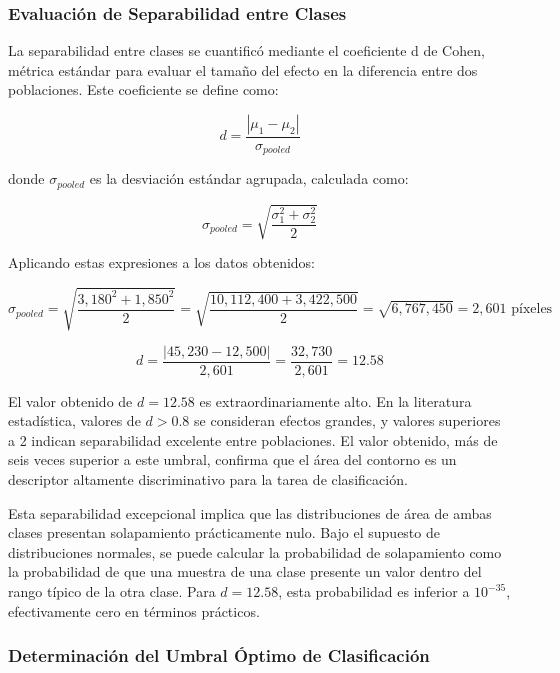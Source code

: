 \subsubsection{Evaluación de Separabilidad entre Clases}

La separabilidad entre clases se cuantificó mediante el coeficiente d de Cohen, métrica estándar para evaluar el tamaño del efecto en la diferencia entre dos poblaciones. Este coeficiente se define como:

\begin{equation}
d = \frac{|\mu_1 - \mu_2|}{\sigma_{pooled}}
\end{equation}

donde $\sigma_{pooled}$ es la desviación estándar agrupada, calculada como:

\begin{equation}
\sigma_{pooled} = \sqrt{\frac{\sigma_1^2 + \sigma_2^2}{2}}
\end{equation}

Aplicando estas expresiones a los datos obtenidos:

\begin{equation}
\sigma_{pooled} = \sqrt{\frac{3,180^2 + 1,850^2}{2}} = \sqrt{\frac{10,112,400 + 3,422,500}{2}} = \sqrt{6,767,450} = 2,601 \text{ píxeles}
\end{equation}

\begin{equation}
d = \frac{|45,230 - 12,500|}{2,601} = \frac{32,730}{2,601} = 12.58
\end{equation}

El valor obtenido de $d = 12.58$ es extraordinariamente alto. En la literatura estadística, valores de $d > 0.8$ se consideran efectos grandes, y valores superiores a 2 indican separabilidad excelente entre poblaciones. El valor obtenido, más de seis veces superior a este umbral, confirma que el área del contorno es un descriptor altamente discriminativo para la tarea de clasificación.

Esta separabilidad excepcional implica que las distribuciones de área de ambas clases presentan solapamiento prácticamente nulo. Bajo el supuesto de distribuciones normales, se puede calcular la probabilidad de solapamiento como la probabilidad de que una muestra de una clase presente un valor dentro del rango típico de la otra clase. Para $d = 12.58$, esta probabilidad es inferior a $10^{-35}$, efectivamente cero en términos prácticos.

\subsubsection{Determinación del Umbral Óptimo de Clasificación}

